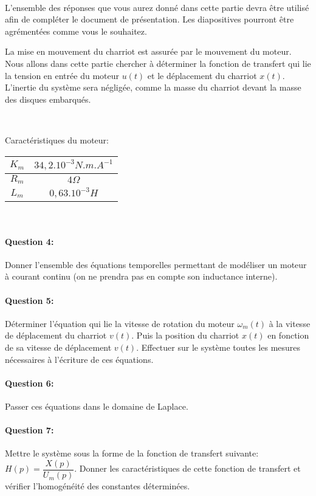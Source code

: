 ~\

L'ensemble des réponses que vous aurez donné dans cette partie devra être utilisé afin de compléter le document de présentation. Les diapositives pourront être agrémentées comme vous le souhaitez.

\ifdef{\public}{\cleardoublepage}{\newpage}


La mise en mouvement du charriot est assurée par le mouvement du moteur. Nous allons dans cette partie chercher à déterminer la fonction de transfert qui lie la tension en entrée du moteur $u(t)$ et le déplacement du charriot $x(t)$. L'inertie du système sera négligée, comme la masse du charriot devant la masse des disques embarqués.

~\

Caractéristiques du moteur:
\begin{tabular}{|c|c|}
\hline
$K_m$ & $34,2.10^{-3}N.m.A^{-1}$ \\
\hline
$R_m$ & $4\Omega$ \\
\hline
$L_m$ & $0,63.10^{-3}H$ \\
\hline
\end{tabular}

~\

\paragraph{Question 4:} Donner l'ensemble des équations temporelles permettant de modéliser un moteur à courant continu (on ne prendra pas en compte son inductance interne).

\paragraph{Question 5:} Déterminer l'équation qui lie la vitesse de rotation du moteur $\omega_m(t)$ à la vitesse de déplacement du charriot $v(t)$. Puis la position du charriot $x(t)$ en fonction de sa vitesse de déplacement $v(t)$. Effectuer sur le système toutes les mesures nécessaires à l'écriture de ces équations.

\paragraph{Question 6:} Passer ces équations dans le domaine de Laplace.

\paragraph{Question 7:} Mettre le système sous la forme de la fonction de transfert suivante: $H(p)=\dfrac{X(p)}{U_m(p)}$. Donner les caractéristiques de cette fonction de transfert et vérifier l'homogénéité des constantes déterminées.

